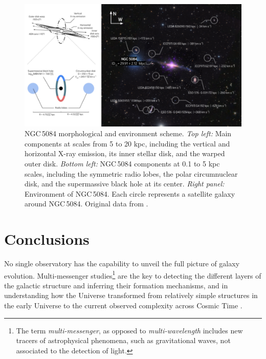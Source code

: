\documentclass[modern]{CORE-AAS/aastex631}
\begin{document}
\begin{figure}[t!]
\begin{center}
\includegraphics[trim={0 0 0 0}, clip, width=\textwidth]{FIGURES/NGC5084_environment_v2.png}
\caption{NGC\,5084 morphological and environment scheme. \emph{Top left:} Main components at scales from 5 to 20 kpc, including the vertical and horizontal X-ray emission, its inner stellar disk, and the warped outer disk. \emph{Bottom left:} NGC\,5084 components at 0.1 to 5 kpc scales, including the symmetric radio lobes, the polar circumnuclear disk, and the supermassive black hole at its center. \emph{Right panel:} Environment of NGC\,5084. Each circle represents a satellite galaxy around NGC\,5084. Original data from \citet{carignan+1997aj113_1585}.} 
\label{fig:NGC5084_environment}
\end{center}
\end{figure}

\section{Conclusions} \label{sec:CON}

No single observatory has the capability to unveil the full picture of galaxy evolution. Multi-messenger studies\footnote{The term \emph{multi-messenger}, as opposed to \emph{multi-wavelength} includes new tracers of astrophysical phenomena, such as gravitational waves, not associated to the detection of light.} are the key to detecting the different layers of the galactic structure and inferring their formation mechanisms, and in understanding how the Universe transformed from relatively simple structures in the early Universe to the current observed complexity across Cosmic Time  \citep{beckman2021book}. \par 
\end{document}
